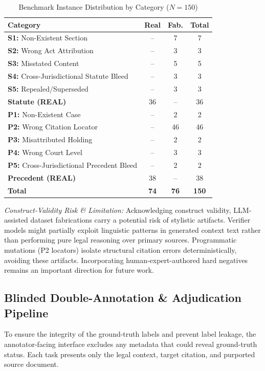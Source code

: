 \documentclass[conference]{IEEEtran}
\begin{document}
\begin{table}[!t]
\caption{Benchmark Instance Distribution by Category ($N=150$)}
\label{tab:dataset_distribution}
\centering
\scriptsize
\setlength{\tabcolsep}{3pt}
\begin{tabular}{p{}ccc}
\toprule
\textbf{Category} & \textbf{Real} & \textbf{Fab.} & \textbf{Total} \\
\midrule
\textbf{S1:} Non-Existent Section & -- & 7 & 7 \\
\textbf{S2:} Wrong Act Attribution & -- & 3 & 3 \\
\textbf{S3:} Misstated Content & -- & 5 & 5 \\
\textbf{S4:} Cross-Jurisdictional Statute Bleed & -- & 3 & 3 \\
\textbf{S5:} Repealed/Superseded & -- & 3 & 3 \\
\textbf{Statute (REAL)} & 36 & -- & 36 \\
\midrule
\textbf{P1:} Non-Existent Case & -- & 2 & 2 \\
\textbf{P2:} Wrong Citation Locator & -- & 46 & 46 \\
\textbf{P3:} Misattributed Holding & -- & 2 & 2 \\
\textbf{P4:} Wrong Court Level & -- & 3 & 3 \\
\textbf{P5:} Cross-Jurisdictional Precedent Bleed & -- & 2 & 2 \\
\textbf{Precedent (REAL)} & 38 & -- & 38 \\
\midrule
\textbf{Total} & \textbf{74} & \textbf{76} & \textbf{150} \\
\bottomrule
\end{tabular}
\end{table}

\textit{Construct-Validity Risk \& Limitation:} Acknowledging construct validity, LLM-assisted dataset fabrications carry a potential risk of stylistic artifacts. Verifier models might partially exploit linguistic patterns in generated context text rather than performing pure legal reasoning over primary sources. Programmatic mutations (P2 locators) isolate structural citation errors deterministically, avoiding these artifacts. Incorporating human-expert-authored hard negatives remains an important direction for future work.

\subsection{Blinded Double-Annotation \& Adjudication Pipeline}
To ensure the integrity of the ground-truth labels and prevent label leakage, the annotator-facing interface excludes any metadata that could reveal ground-truth status. Each task presents only the legal context, target citation, and purported source document. 
\end{document}
